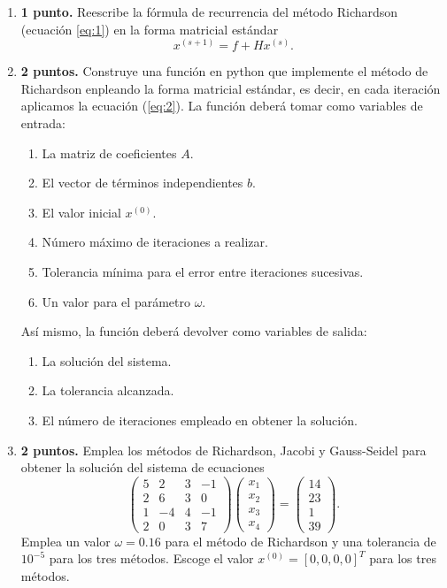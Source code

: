  \begin{enumerate}
\item {\bf 1 punto.} Reescribe la fórmula de recurrencia del método Richardson (ecuación \ref{eq:1})  en la forma matricial estándar
\begin{equation}\label{eq:2}
x^{(s+1)} = f + Hx^{(s)}.
\end{equation}

\item {\bf 2 puntos.} Construye una función en python que implemente el método de Richardson enpleando la forma matricial estándar, es decir, en cada iteración aplicamos la ecuación (\ref{eq:2}). La función deberá tomar como variables de entrada: 
\begin{enumerate}
	\item La matriz de coeficientes $A$.
	\item El vector de términos independientes $b$.
	\item El valor inicial $x^{(0)}$.
	\item Número máximo de iteraciones a realizar.
	\item Tolerancia mínima para el error entre iteraciones sucesivas.
	\item Un valor para el parámetro $\omega$.
\end{enumerate}
Así mismo, la función deberá devolver como variables de salida: 
\begin{enumerate}
\item La solución del sistema.
\item La tolerancia alcanzada.
\item El número de iteraciones empleado en obtener la solución.
\end{enumerate}

\item {\bf 2 puntos.} Emplea los métodos de Richardson, Jacobi y Gauss-Seidel para obtener la solución del sistema de ecuaciones
\begin{equation*}
\begin{pmatrix}
5&2&3&-1\\
2&6&3&0\\
1&-4&4&-1\\
2&0&3&7
\end{pmatrix}\begin{pmatrix}
x_1\\ x_2\\ x_3\\ x_4
\end{pmatrix}= \begin{pmatrix}
14\\ 23\\1\\ 39
\end{pmatrix}.
\end{equation*}
		 Emplea un valor $\omega = 0.16$ para el método de Richardson y una tolerancia de $10^{-5}$ para los tres métodos. Escoge el valor $x^{(0)}=\left[0,0,0,0\right]^T$ para los tres métodos.


\end{enumerate}
